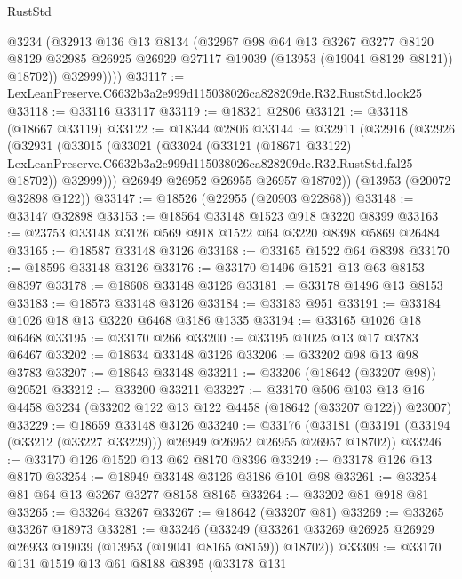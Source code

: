 \begin{lexlean}{RustStd}
\begin{coremodule}
            @3234
            (@32913
              @136
              @13
              @8134
              (@32967
                @98
                @64
                @13
                @3267
                @3277
                @8120
                @8129
                @32985
                @26925
                @26929
                @27117
                @19039
                (@13953 (@19041 @8129 @8121))
                @18702))
            @32999))))
@33117 := LexLeanPreserve.C6632b3a2e999d115038026ca828209de.R32.RustStd.look25
@33118 := @33116 @33117
@33119 := @18321 @2806
@33121 := @33118 (@18667 @33119)
@33122 := @18344 @2806
@33144 := @32911
    (@32916
      (@32926
        (@32931
          (@33015
            (@33021
              (@33024
                (@33121
                  (@18671 @33122)
                  LexLeanPreserve.C6632b3a2e999d115038026ca828209de.R32.RustStd.fal25
                  @18702))
              @32999)))
        @26949
        @26952
        @26955
        @26957
        @18702))
    (@13953 (@20072 @32898 @122))
@33147 := @18526 (@22955 (@20903 @22868))
@33148 := @33147 @32898
@33153 := @18564 @33148 @1523 @918 @3220 @8399
@33163 := @23753 @33148 @3126 @569 @918 @1522 @64 @3220 @8398 @5869 @26484
@33165 := @18587 @33148 @3126
@33168 := @33165 @1522 @64 @8398
@33170 := @18596 @33148 @3126
@33176 := @33170 @1496 @1521 @13 @63 @8153 @8397
@33178 := @18608 @33148 @3126
@33181 := @33178 @1496 @13 @8153
@33183 := @18573 @33148 @3126
@33184 := @33183 @951
@33191 := @33184 @1026 @18 @13 @3220 @6468 @3186 @1335
@33194 := @33165 @1026 @18 @6468
@33195 := @33170 @266
@33200 := @33195 @1025 @13 @17 @3783 @6467
@33202 := @18634 @33148 @3126
@33206 := @33202 @98 @13 @98 @3783
@33207 := @18643 @33148
@33211 := @33206 (@18642 (@33207 @98)) @20521
@33212 := @33200 @33211
@33227 := @33170
    @506
    @103
    @13
    @16
    @4458
    @3234
    (@33202 @122 @13 @122 @4458 (@18642 (@33207 @122)) @23007)
@33229 := @18659 @33148 @3126
@33240 := @33176
    (@33181 (@33191 (@33194 (@33212 (@33227 @33229))) @26949 @26952 @26955 @26957 @18702))
@33246 := @33170 @126 @1520 @13 @62 @8170 @8396
@33249 := @33178 @126 @13 @8170
@33254 := @18949 @33148 @3126 @3186 @101 @98
@33261 := @33254 @81 @64 @13 @3267 @3277 @8158 @8165
@33264 := @33202 @81 @918 @81
@33265 := @33264 @3267
@33267 := @18642 (@33207 @81)
@33269 := @33265 @33267 @18973
@33281 := @33246
    (@33249 (@33261 @33269 @26925 @26929 @26933 @19039 (@13953 (@19041 @8165 @8159)) @18702))
@33309 := @33170
    @131
    @1519
    @13
    @61
    @8188
    @8395
    (@33178
      @131

\end{coremodule}
\end{lexlean}
